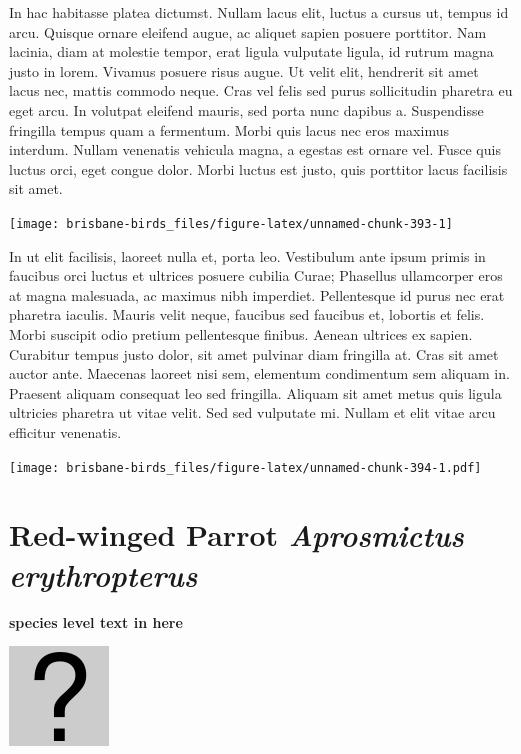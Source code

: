 \documentclass[]{book}
\let\origfigure\figure
\let\endorigfigure\endfigure
\renewenvironment{figure}[1][2] {
  \expandafter\origfigure\expandafter[H]
} {
  \endorigfigure
}
\begin{document}
In hac habitasse platea dictumst. Nullam lacus elit, luctus a cursus ut,
tempus id arcu. Quisque ornare eleifend augue, ac aliquet sapien posuere
porttitor. Nam lacinia, diam at molestie tempor, erat ligula vulputate
ligula, id rutrum magna justo in lorem. Vivamus posuere risus augue. Ut
velit elit, hendrerit sit amet lacus nec, mattis commodo neque. Cras vel
felis sed purus sollicitudin pharetra eu eget arcu. In volutpat eleifend
mauris, sed porta nunc dapibus a. Suspendisse fringilla tempus quam a
fermentum. Morbi quis lacus nec eros maximus interdum. Nullam venenatis
vehicula magna, a egestas est ornare vel. Fusce quis luctus orci, eget
congue dolor. Morbi luctus est justo, quis porttitor lacus facilisis sit
amet.

\begin{figure}
\texttt{[image: brisbane-birds\_files/figure-latex/unnamed-chunk-393-1]} \caption{insert figure caption}\label{fig:unnamed-chunk-393}
\end{figure}

In ut elit facilisis, laoreet nulla et, porta leo. Vestibulum ante ipsum
primis in faucibus orci luctus et ultrices posuere cubilia Curae;
Phasellus ullamcorper eros at magna malesuada, ac maximus nibh
imperdiet. Pellentesque id purus nec erat pharetra iaculis. Mauris velit
neque, faucibus sed faucibus et, lobortis et felis. Morbi suscipit odio
pretium pellentesque finibus. Aenean ultrices ex sapien. Curabitur
tempus justo dolor, sit amet pulvinar diam fringilla at. Cras sit amet
auctor ante. Maecenas laoreet nisi sem, elementum condimentum sem
aliquam in. Praesent aliquam consequat leo sed fringilla. Aliquam sit
amet metus quis ligula ultricies pharetra ut vitae velit. Sed sed
vulputate mi. Nullam et elit vitae arcu efficitur venenatis.

\begin{figure}
\centering
\texttt{[image: brisbane-birds\_files/figure-latex/unnamed-chunk-394-1.pdf]}
\caption{\label{fig:unnamed-chunk-394}insert figure caption}
\end{figure}

\section{\texorpdfstring{Red-winged Parrot \emph{Aprosmictus
erythropterus}}{Red-winged Parrot Aprosmictus erythropterus}}\label{red-winged-parrot-aprosmictus-erythropterus}

\textbf{species level text in here}

\begin{figure}
\centering
\includegraphics{assets/missing.png}
\caption{No image for species}
\end{figure}
\end{document}
